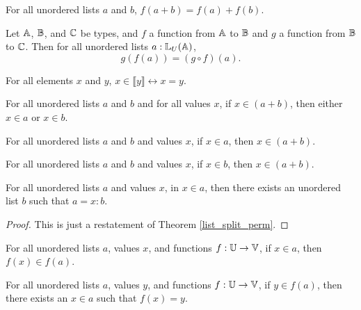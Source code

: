 \documentclass[../../math.tex]{subfiles}
\begin{document}
\begin{theorem}
    For all unordered lists $a$ and $b$, $f(a + b) = f(a) + f(b)$.
\end{theorem}

\begin{theorem}
    Let $\mathbb{A}$, $\mathbb{B}$, and $\mathbb{C}$ be types, and $f$ a function from $\mathbb{A}$ to $\mathbb{B}$ and
    $g$ a function from $\mathbb{B}$ to $\mathbb{C}$.  Then for all unordered lists $a :
    \mathbb{L}_U(\mathbb{A})$,
    \[
        g(f(a)) = (g \circ f)(a).
    \]
\end{theorem}

\begin{theorem}
    For all elements $x$ and $y$, $x \in \llbracket y\rrbracket \leftrightarrow
    x = y$.
\end{theorem}

\begin{theorem} \label{in_ulist_conc}
    For all unordered lists $a$ and $b$ and for all values $x$, if $x \in (a +
    b)$, then either $x \in a$ or $x \in b$.
\end{theorem}

\begin{theorem} \label{in_ulist_lconc}
    For all unordered lists $a$ and $b$ and values $x$, if $x \in a$, then $x
    \in (a + b)$.
\end{theorem}

\begin{theorem} \label{in_ulist_rconc}
    For all unordered lists $a$ and $b$ and values $x$, if $x \in b$, then $x
    \in (a + b)$.
\end{theorem}

\begin{theorem} \label{in_ulist_split}
    For all unordered lists $a$ and values $x$, in $x \in a$, then there exists
    an unordered list $b$ such that $a = x : b$.
\end{theorem}
\begin{proof}
    This is just a restatement of Theorem \ref{list_split_perm}.
\end{proof}

\begin{theorem} \label{in_ulist_image}
    For all unordered lists $a$, values $x$, and functions $f : \mathbb{U} \to \mathbb{V}$, if
    $x \in a$, then $f(x) \in f(a)$.
\end{theorem}

\begin{theorem} \label{image_in_ulist}
    For all unordered lists $a$, values $y$, and functions $f : \mathbb{U} \to \mathbb{V}$, if
    $y \in f(a)$, then there exists an $x \in a$ such that $f(x) = y$.
\end{theorem}
\end{document}
